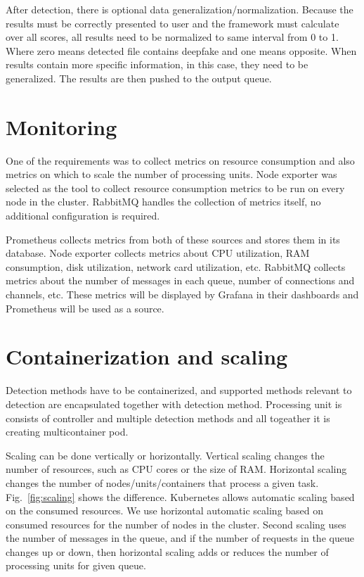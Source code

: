 After detection, there is optional data generalization/normalization. Because the results must be correctly presented to user and the framework must calculate over all scores, all results need to be normalized to same interval from 0 to 1. Where zero means detected file contains deepfake and one means opposite. When results contain more specific information, in this case, they need to be generalized. The results are then pushed to the output queue.

\section{Monitoring}

One of the requirements was to collect metrics on resource consumption and also metrics on which to scale the number of processing units. Node exporter was selected as the tool to collect resource consumption metrics to be run on every node in the cluster. RabbitMQ handles the collection of metrics itself, no additional configuration is required.

Prometheus collects metrics from both of these sources and stores them in its database. Node exporter collects metrics about CPU utilization, RAM consumption, disk utilization, network card utilization, etc. RabbitMQ collects metrics about the number of messages in each queue, number of connections and channels, etc. These metrics will be displayed by Grafana in their dashboards and Prometheus will be used as a source.

\section{Containerization and scaling}

Detection methods have to be containerized, and supported methods relevant to detection are encapsulated together with detection method. Processing unit is consists of controller and multiple detection methods and all togeather it is creating multicontainer pod.

Scaling can be done vertically or horizontally. Vertical scaling changes the number of resources, such as CPU cores or the size of RAM. Horizontal scaling changes the number of nodes/units/containers that process a given task. Fig.~\ref{fig:scaling} shows the difference. Kubernetes allows automatic scaling based on the consumed resources. We use horizontal automatic scaling based on consumed resources for the number of nodes in the cluster. Second scaling uses the number of messages in the queue, and if the number of requests in the queue changes up or down, then horizontal scaling adds or reduces the number of processing units for given queue.~\cite{Scaling}


